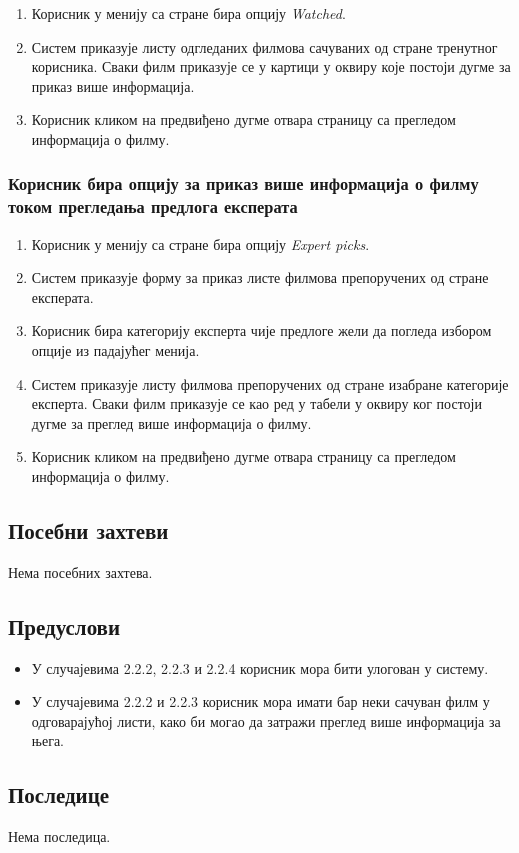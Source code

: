 \begin{enumerate}
    \item Корисник у менију са стране бира опцију \textit{Watched}.
    \item Систем приказује листу одгледаних филмова сачуваних од стране тренутног корисника. Сваки филм 
    приказује се у картици у оквиру које постоји дугме за приказ више информација.
    \item Корисник кликом на предвиђено дугме отвара страницу са прегледом информација о филму.
\end{enumerate}

\subsubsection{Корисник бира опцију за приказ више информација о филму током прегледања предлога експерата}

\begin{enumerate}
    \item Корисник у менију са стране бира опцију \textit{Expert picks}.
    \item Систем приказује форму за приказ листе филмова препоручених од стране експерата.
    \item Корисник бира категорију експерта чије предлоге жели да погледа избором опције из падајућег менија.
    \item Систем приказује листу филмова препоручених од стране изабране категорије експерта. Сваки филм приказује 
    се као ред у табели у оквиру ког постоји дугме за преглед више информација о филму.
    \item Корисник кликом на предвиђено дугме отвара страницу са прегледом информација о филму.
\end{enumerate}

\subsection{Посебни захтеви}

Нема посебних захтева.

\subsection{Предуслови}

\begin{itemize}
    \item У случајевима 2.2.2, 2.2.3 и 2.2.4 корисник мора бити улогован у систему. 
    \item У случајевима 2.2.2 и 2.2.3 корисник мора имати бар неки сачуван филм у одговарајућој листи, 
    како би могао да затражи преглед више информација за њега.
\end{itemize}

\subsection{Последице}

Нема последица.

